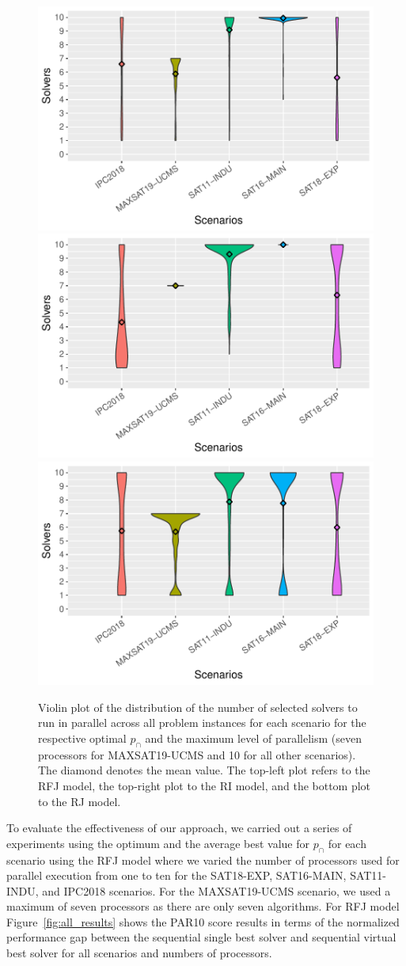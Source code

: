 \begin{figure}
    \includegraphics[width=0.5\linewidth]{plots/x_Scenario_y_Solver.pdf}
    \includegraphics[width=0.5\linewidth]{plots/number_of_solvers_infjack_pcap.pdf}
    \includegraphics[width=0.5\linewidth]{plots/number_of_solvers_jack_pcap.pdf}

    \caption[Distribution of Number of Selected Solvers when Using $AS_{p_{\cap}}$]{
    Violin plot of the distribution of the number of selected solvers to run in parallel across all problem instances for each scenario for the respective optimal $p_{\cap}$ and the maximum level of parallelism (seven processors for MAXSAT19-UCMS and 10 for all other scenarios). The diamond denotes the mean value. The top-left plot refers to the RFJ model, the top-right plot to the RI model, and the bottom plot to the RJ model.
    }
    \label{fig:x_Scenario_y_Solver}
\end{figure}

To evaluate the effectiveness of our approach, we carried out a series of experiments using the optimum and the average best value for $p_{\cap}$ for each scenario using the RFJ model where we varied the number of processors used for parallel execution from one to ten for the SAT18-EXP, SAT16-MAIN, SAT11-INDU, and IPC2018 scenarios. For the MAXSAT19-UCMS scenario, we used a maximum of seven processors as there are only seven algorithms. For RFJ model Figure~\ref{fig:all_results} shows the PAR10 score results in terms of the normalized performance gap between the sequential single best solver and sequential virtual best solver for all scenarios and numbers of processors.


